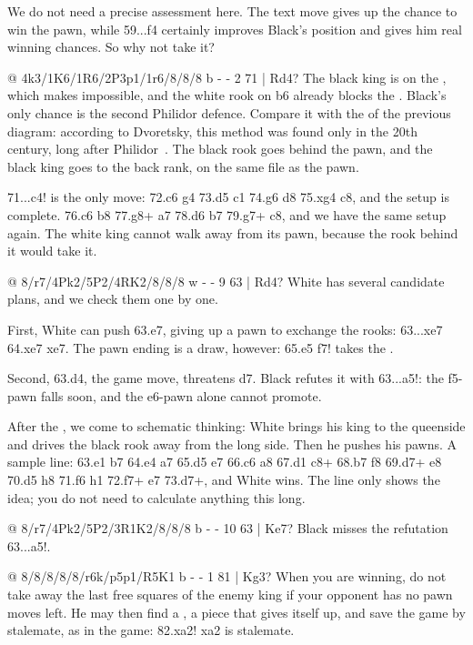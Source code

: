 We do not need a precise assessment here. The text move gives up the chance to win the pawn, while
59...f4 certainly improves Black's position and gives him real winning chances. So why not take it?

@ 4k3/1K6/1R6/2P3p1/1r6/8/8/8 b - - 2 71 | Rd4?
The black king is on the , which makes 
impossible, and the white rook on b6 already blocks the
. Black's only chance is the second Philidor defence. Compare it with the  of the
previous diagram: according to Dvoretsky, this method was found only in the 20th century, long
after Philidor~\cite{Dvoretsky:2008-endgame-manual}. The black rook goes behind the pawn, and the black king
goes to the back rank, on the same file as the pawn.

71...\R c4! is the only move: 72.\K c6 g4 73.\K d5 \R c1 74.\R g6 \K d8 75.\R xg4 \K c8, and the
setup is complete. 76.\K c6 \K b8 77.\R g8+ \K a7 78.\K d6 \K b7 79.\R g7+ \K c8, and we have the
same setup again. The white king cannot walk away from its pawn, because the rook behind it would
take it.

@ 8/r7/4Pk2/5P2/4RK2/8/8/8 w - - 9 63 | Rd4?
White has several candidate plans, and we check them one by one.

First, White can push 63.e7, giving up a pawn to exchange the rooks: 63...\R xe7 64.\R xe7 \K xe7.
The pawn ending is a draw, however: 65.\K e5 \K f7! takes the .

Second, 63.\R d4, the game move, threatens \R d7. Black refutes it with 63...\R a5!: the f5-pawn
falls soon, and the e6-pawn alone cannot promote.

After the , we come to schematic thinking:
White brings his king to the queenside and drives the black rook away from the long side. Then he
pushes his pawns. A sample line: 63.\R e1 \R b7 64.\K e4 \R a7 65.\K d5 \K e7 66.\K c6 \R a8
67.\R d1 \R c8+ 68.\K b7 \R f8 69.\R d7+ \K e8 70.\R d5 \R h8 71.f6 \R h1 72.f7+ \K e7 73.\R d7+,
and White wins. The line only shows the idea; you do not need to calculate anything this long.

@ 8/r7/4Pk2/5P2/3R1K2/8/8/8 b - - 10 63 | Ke7?
Black misses the refutation 63...\R a5!.

@ 8/8/8/8/8/r6k/p5p1/R5K1 b - - 1 81 | Kg3?
When you are winning, do not take away the last free squares of the enemy king if your opponent
has no pawn moves left. He may then find a
, a piece that gives itself up, and save
the game by stalemate, as in the game:
82.\R xa2! \R xa2 is stalemate.

